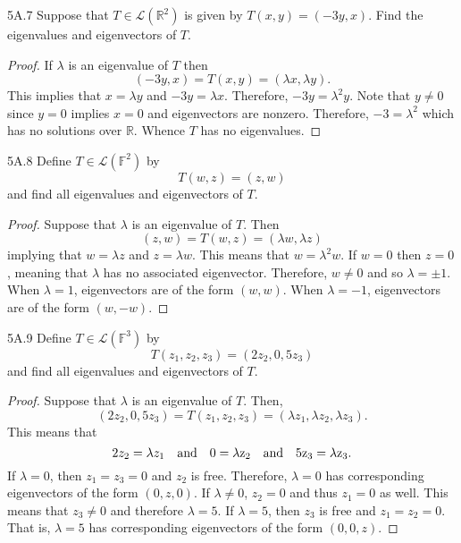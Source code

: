 \documentclass{article}
\newcommand{\R}{\mathbb{R}}
\newcommand{\F}{\mathbb{F}}
\newcommand{\scr}{\mathscr}
\theoremstyle{definition}
\begin{document}
\begin{LA}{5A.7}{}
Suppose that $T \in \scr{L}(\R^2)$ is given by $T(x,y) = (-3y, x)$. Find the eigenvalues  and eigenvectors of $T$.
\end{LA}

\begin{proof}
If $\lambda$ is an eigenvalue of $T$ then
	\[(-3y, x) = T(x,y) = (\lambda x, \lambda y). \]
This implies that $x = \lambda y$ and $-3y = \lambda x$. Therefore, $-3y = \lambda^2 y$. Note that $y\neq 0$ since $y = 0$ implies $x = 0$ and eigenvectors are nonzero. Therefore, $-3 = \lambda^2$ which has no solutions over $\R$. Whence $T$ has no eigenvalues.
\end{proof}

\begin{LA}{5A.8}{}
Define $T \in\scr{L}(\F^2)$ by
	\[T(w,z) = (z,w)\]
and find all eigenvalues and eigenvectors of $T$.
\end{LA}

\begin{proof}
Suppose that $\lambda$ is an eigenvalue of $T$. Then
	\[(z,w) = T(w,z) = (\lambda w, \lambda z) \]
implying that $w = \lambda z$ and $z = \lambda w$. This means that $w = \lambda^2 w$. If $w= 0$ then $z = 0$, meaning that $\lambda$ has no associated eigenvector. Therefore, $w \neq 0$ and so $\lambda = \pm 1$. When $\lambda = 1$, eigenvectors are of the form $(w,w)$. When $\lambda = -1$, eigenvectors are of the form $(w,-w)$.
\end{proof}

\begin{LA}{5A.9}{}
Define $T \in \scr{L}(\F^3)$ by
	\[T(z_1, z_2, z_3) = (2z_2, 0, 5z_3) \]
and find all eigenvalues and eigenvectors of $T$.
\end{LA}

\begin{proof}
Suppose that $\lambda$ is an eigenvalue of $T$. Then,
	\[(2z_2, 0, 5z_3) = T(z_1, z_2, z_3) = (\lambda z_1, \lambda z_2, \lambda z_3). \]
This means that
	\[2z_2 = \lambda z_1 \quad \rm{and} \quad 0 = \lambda z_2 \quad \rm{and} \quad 5z_3 = \lambda z_3. \]
If $\lambda = 0$, then $z_1 = z_3 = 0$ and $z_2$ is free. Therefore, $\lambda = 0$ has corresponding eigenvectors of the form $(0, z, 0)$. If $\lambda \neq 0$, $z_2 = 0$ and thus $z_1 = 0$ as well. This means that $z_3 \neq 0$ and therefore $\lambda = 5$. If $\lambda = 5$, then $z_3$ is free and $z_1 = z_2 = 0$. That is, $\lambda = 5$ has corresponding eigenvectors of the form $(0,0,z)$.
\end{proof}
\end{document}
